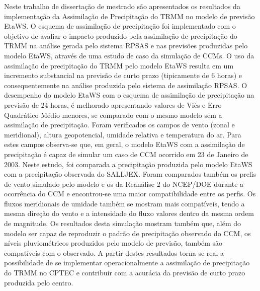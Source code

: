 \begin{resumo}
\hypertarget{estilo:abstract}{}

Neste trabalho de dissertação de mestrado são apresentados os resultados da implementação da Assimilação de Precipitação do TRMM no modelo de previsão EtaWS. O esquema de assimilação de precipitação foi implementado com o objetivo de avaliar o impacto produzido pela assimilação de precipitação do TRMM na análise gerada pelo sistema RPSAS e nas previsões produzidas pelo modelo EtaWS, através de uma estudo de caso da simulação de CCMs. O uso da assimilação de precipitação do TRMM pelo modelo EtaWS resulta em um incremento substancial na previsão de curto prazo (tipicamente de 6 horas) e consequentemente na análise produzida pelo sistema de assimilação RPSAS. O desempenho do modelo EtaWS com o esquema de assimilação de precipitação na previsão de 24 horas, é melhorado apresentando valores de Viés e Erro Quadrático Médio menores, se comparado com o mesmo modelo sem a assimilação de precipitação. Foram verificados os campos de vento (zonal e meridional), altura geopotencial, umidade relativa e temperatura do ar. Para estes campos observa-se que, em geral, o modelo EtaWS com a assimilação de precipitação é capaz de simular um caso de CCM ocorrido em 23 de Janeiro de 2003. Neste estudo, foi comparada a precipitação produzida pelo modelo EtaWS com a precipitação observada do SALLJEX. Foram comparados também os prefis de vento simulado pelo modelo e os da Reanálise 2 do NCEP/DOE durante a ocorrência do CCM e encontrou-se uma maior compatibilidade entre os perfis. Os fluxos meridionais de umidade também se mostram mais compatíveis, tendo a mesma direção do vento e a intensidade do fluxo valores dentro da mesma ordem de magnitude. Os resultados desta simulação mostram também que, além do modelo ser capaz de reproduzir o padrão de precipitação observado do CCM, os níveis pluviométricos produzidos pelo modelo de previsão, também são compatíveis com o observado. A partir destes resultados torna-se real a possibilidade de se implementar operacionalmente a assimilação de precipitação do TRMM no CPTEC e contribuir com a acurácia da previsão de curto prazo produzida pelo centro.

\end{resumo}
